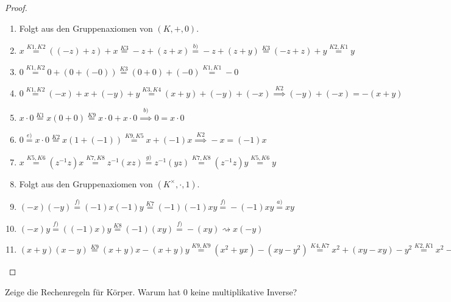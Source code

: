 \begin{proof}\ 
\begin{enumerate}[label=\alph*)]
    \item Folgt aus den Gruppenaxiomen von $(K, +, 0)$.
    \item $x \stackrel{K1, K2}{=} ((-z) + z) + x \stackrel{K3}{=} -z + (z +x)\stackrel{b)}{=} -z + (z + y) \stackrel{K3}{=} (-z + z) + y \stackrel{K2, K1}{=} y $
    \item $0 \stackrel{K1, K2}{=} 0 + (0 + (-0)) \stackrel{K3}{=} (0 + 0) + (-0) \stackrel{K1, K1}{=} -0$
    \item $0 \stackrel{K1, K2}{=} (-x)+x+(-y)+y \stackrel{K3, K4}{=} (x+y) + (-y) + (-x) \stackrel{K2}{\implies} (-y) + (-x) = -(x+y)$
    \item $x\cdot0 \stackrel{K1}{=} x(0+0) \stackrel{K9}{=} x\cdot 0 + x \cdot 0 \stackrel{b)}{\implies} 0 = x \cdot 0$ 
    \item $0 \stackrel{e)}{=} x \cdot 0 \stackrel{K2}{=} x(1 + (-1)) \stackrel{K9, K5}{=} x + (-1)x \stackrel{K2}{\implies} -x = (-1)x$
    \item $x \stackrel{K5, K6}{=} (z^{-1} z)x\stackrel{K7, K8}{=}z^{-1}(xz)\stackrel{g)}{=}z^{-1}(yz)\stackrel{K7, K8}{=}(z^{-1}z)y\stackrel{K5, K6}{=}y$
    \item Folgt aus den Gruppenaxiomen von $(K^\times, \cdot, 1)$.
    \item $(-x)(-y) \stackrel{f)}{=}(-1)x(-1)y\stackrel{K7}{=}(-1)(-1)xy\stackrel{f)}{=}-(-1)xy\stackrel{a)}{=}xy$
    \item $(-x)y \stackrel{f)}{=}((-1)x)y\stackrel{K8}{=}(-1)(xy)\stackrel{f)}{=}-(xy) \rightsquigarrow x(-y)$
    \item $(x+y)(x-y) \stackrel{K9}{=} (x+y)x-(x+y)y \stackrel{K9, K9}{=} (x^2+yx)-(xy-y^2) \stackrel{K4, K7}{=} x^2+(xy-xy)-y^2 \stackrel{K2, K1}{=} x^2-y^2$
\end{enumerate}
\end{proof}

\begin{exercise} Zeige die Rechenregeln für Körper. Warum hat 0 keine multiplikative Inverse?
\end{exercise}

